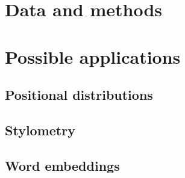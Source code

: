 \documentclass[12pt]{article}
\begin{document}




\section{Data and methods}
\label{sec:data}







\section{Possible applications}
\label{sec:applications}


\subsection{Positional distributions}


\subsection{Stylometry}



\subsection{Word embeddings}


\end{document}
